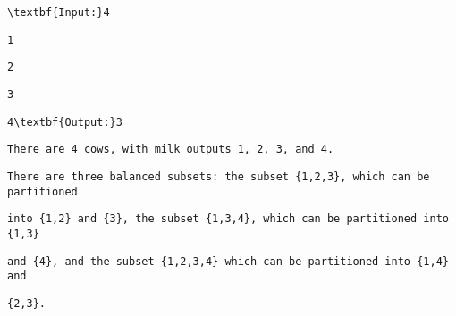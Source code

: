 \begin{verbatim}
\textbf{Input:}4 \end{verbatim}
\begin{verbatim}
1 \end{verbatim}
\begin{verbatim}
2 \end{verbatim}
\begin{verbatim}
3 \end{verbatim}
\begin{verbatim}
4\textbf{Output:}3\end{verbatim}
\begin{verbatim}
There are 4 cows, with milk outputs 1, 2, 3, and 4.\end{verbatim}
\begin{verbatim}
There are three balanced subsets: the subset {1,2,3}, which can be partitioned \end{verbatim}
\begin{verbatim}
into {1,2} and {3}, the subset {1,3,4}, which can be partitioned into {1,3} \end{verbatim}
\begin{verbatim}
and {4}, and the subset {1,2,3,4} which can be partitioned into {1,4} and \end{verbatim}
\begin{verbatim}
{2,3}.\end{verbatim}